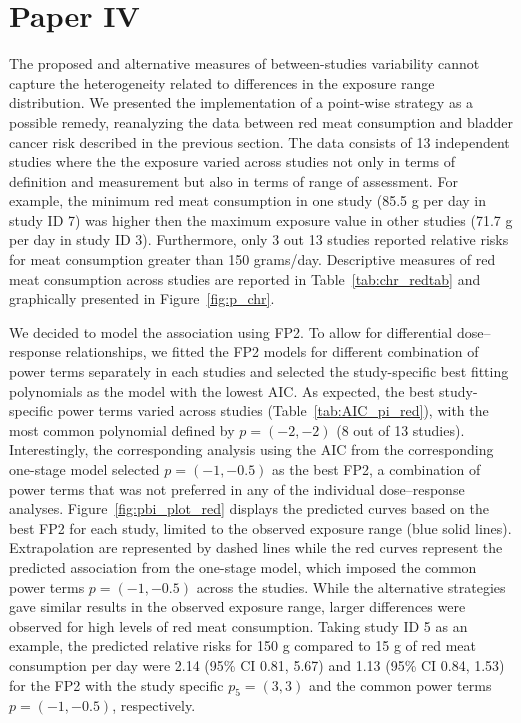 \documentclass[11pt,a4paper,twoside,openany]{book}\usepackage{knitr}
\begin{document}
{{\section{Paper IV}\label{sec:res_paperIV}

\noindent The proposed and alternative measures of between-studies variability cannot capture the heterogeneity related to differences in the exposure range distribution. We presented the implementation of a point-wise strategy as a possible remedy, reanalyzing the data between red meat consumption and bladder cancer risk described in the previous section.
The data consists of 13 independent studies where the the exposure varied across studies not only in terms of definition and measurement but also in terms of range of assessment. For example, the minimum red meat consumption in one study (85.5 g per day in study ID 7) was higher then the maximum exposure value in other studies (71.7 g per day in study ID 3). Furthermore, only 3 out 13 studies reported relative risks for meat consumption greater than 150 grams/day. Descriptive measures of red meat consumption across studies are reported in Table~\ref{tab:chr_redtab} and graphically presented in Figure~\ref{fig:p_chr}.

We decided to model the association using FP2. To allow for differential dose--response relationships, we fitted the FP2 models for different combination of power terms separately in each studies and selected the study-specific best fitting polynomials as the model with the lowest AIC. As expected, the best study-specific power terms varied across studies (Table~\ref{tab:AIC_pi_red}), with the most common polynomial defined by $p = (-2, -2)$ (8 out of 13 studies). Interestingly, the corresponding analysis using the AIC from the corresponding one-stage model selected $p = (-1, -0.5)$ as the best FP2, a combination of power terms that was not preferred in any of the individual dose--response analyses. Figure~\ref{fig:pbi_plot_red} displays the predicted curves based on the best FP2 for each study, limited to the observed exposure range (blue solid lines). Extrapolation are represented by dashed lines while the red curves represent the predicted association from the one-stage model, which imposed the common power terms $p = (-1, -0.5)$ across the studies. While the alternative strategies gave similar results in the observed exposure range, larger differences were observed for high levels of red meat consumption. Taking study ID 5 as an example, the predicted relative risks for 150 g compared to 15 g of red meat consumption per day were 2.14 (95\% CI 0.81, 5.67) and 1.13 (95\% CI 0.84, 1.53) for the FP2 with the study specific $p_5 = (3, 3)$ and the common power terms $p = (-1, -0.5)$, respectively. 

}}
\end{document}
